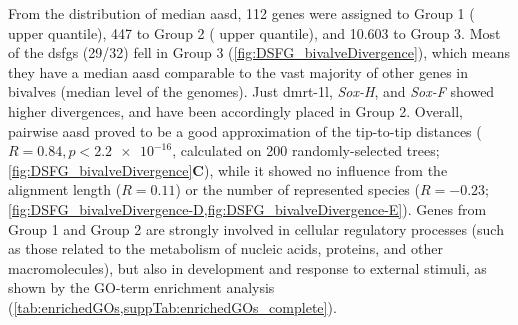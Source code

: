 From the distribution of median \gls{aasd}, 112 genes were assigned to Group 1 (\onepercent{} upper quantile), 447 to Group 2 (\fivepercent{} upper quantile), and 10.603 to Group 3. Most of the \glspl{dsfg} (29/32) fell in Group 3 (\cref{fig:DSFG_bivalveDivergence}), which means they have a median \gls{aasd} comparable to the vast majority of other genes in bivalves (median level of the genomes). Just \gls{dmrt-1l}, \textit{Sox-H}, and \textit{Sox-F} showed higher divergences, and have been accordingly placed in Group 2. Overall, pairwise \gls{aasd} proved to be a good approximation of the tip-to-tip distances ($R = 0.84, p < \num{2.2e-16}$, calculated on 200 randomly-selected trees; \cref{fig:DSFG_bivalveDivergence}\textbf{C}), while it showed no influence from the alignment length ($R = 0.11$) or the number of represented species ($R = -0.23$; \cref{fig:DSFG_bivalveDivergence-D,fig:DSFG_bivalveDivergence-E}). Genes from Group 1 and Group 2 are strongly involved in cellular regulatory processes (such as those related to the metabolism of nucleic acids, proteins, and other macromolecules), but also in development and response to external stimuli, as shown by the GO-term enrichment analysis (\cref{tab:enrichedGOs,suppTab:enrichedGOs_complete}).

